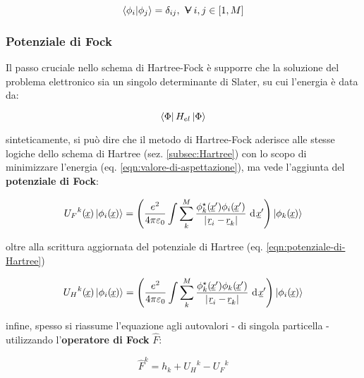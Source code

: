 \begin{equation}\label{eqn:ortonormalità}
    \braket{\phi_i}{\phi_j} = \delta_{ij},\ \forall\ i,j\in[1,M]
\end{equation}

\subsubsection{Potenziale di Fock}

Il passo cruciale nello schema di Hartree-Fock è supporre che la soluzione del problema elettronico sia un singolo determinante di Slater, su cui l'energia è data da:

\begin{equation}\label{eqn:valore-di-aspettazione}
    \bra{\Phi}H_{el}\ket{\Phi}
\end{equation}

sinteticamente, si può dire che il metodo di Hartree-Fock aderisce alle stesse logiche dello schema di Hartree (sez. \ref{subsec:Hartree}) con lo scopo di minimizzare l'energia (eq. \ref{eqn:valore-di-aspettazione}), ma vede l'aggiunta del \textbf{potenziale di Fock}:

\begin{equation}\label{eqn:potenziale-di-Fock}
    {U_{F}}^k(\underline{\hspace{-0.1em}x\hspace{-0.05em}})\ket{\phi_i(\underline{\hspace{-0.1em}x\hspace{-0.05em}})} = 
    \left(
        \frac{e^2}{4\pi\varepsilon_0}
        \int \sum_{k}^{M} 
        \frac{\phi^{\star}_{k}(\underline{\hspace{-0.1em}x\hspace{-0.05em}}')\phi_{i}(\underline{\hspace{-0.1em}x\hspace{-0.05em}}')}{|\,\underline{\hspace{-0.1em}r\hspace{-0.05em}}_i - \underline{\hspace{-0.1em}r\hspace{-0.05em}}_k |}
        \ \text{d}\,\underline{\hspace{-0.1em}x\hspace{-0.05em}}' 
    \right)
    \ket{\phi_k(\underline{\hspace{-0.1em}x\hspace{-0.05em}})}
\end{equation}

oltre alla scrittura aggiornata del potenziale di Hartree (eq. \ref{eqn:potenziale-di-Hartree})

\begin{equation}\label{eqn:potenziale-di-Hartree-HF}
    {U_{H}}^k(\underline{\hspace{-0.1em}x\hspace{-0.05em}})\ket{\phi_i(\underline{\hspace{-0.1em}x\hspace{-0.05em}})} = 
    \left(
        \frac{e^2}{4\pi\varepsilon_0}
        \int \sum_{k}^{M} 
        \frac{\phi^{\star}_{k}(\underline{\hspace{-0.1em}x\hspace{-0.05em}}')\phi_{k}(\underline{\hspace{-0.1em}x\hspace{-0.05em}}')}{|\,\underline{\hspace{-0.1em}r\hspace{-0.05em}}_i - \underline{\hspace{-0.1em}r\hspace{-0.05em}}_k |}
        \ \text{d}\,\underline{\hspace{-0.1em}x\hspace{-0.05em}}' 
    \right)
    \ket{\phi_i(\underline{\hspace{-0.1em}x\hspace{-0.05em}})}
\end{equation}

infine, spesso si riassume l'equazione agli autovalori - di singola particella - utilizzando l'\textbf{operatore di Fock} $\hat{F}$:

\begin{equation}\label{eqn:operatore-di-Fock}
    \hat{F}^k = h_k + {U_H}^k - {U_F}^k
\end{equation}

